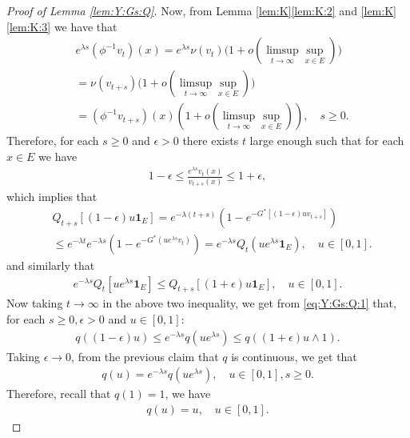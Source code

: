 \documentclass[12pt,a4paper]{amsart}
\numberwithin{equation}{section}
\theoremstyle{plain}
\theoremstyle{definition}
\begin{document}
\begin{proof}[Proof of Lemma \ref{lem:Y:Gs:Q}]
Now, from Lemma \ref{lem:K}\eqref{lem:K:2} and \ref{lem:K}\eqref{lem:K:3} we have that
\begin{align}
	& e^{\lambda s}(\phi^{-1}v_t)(x) 
  = e^{\lambda s}\nu(v_{t})\big(1+o(\limsup_{t\to \infty}\sup_{x\in E})\big) \\
  & =\nu(v_{t+s}) \big(1+o(\limsup_{t\to \infty}\sup_{x\in E})\big) \\
  & = (\phi^{-1}v_{t+s})(x) (1+o(\limsup_{t\to \infty} \sup_{x\in E}))
    , \quad s\geq 0.
\end{align}
Therefore, for each $s\geq 0$ and $\epsilon>0$ there exists $t$ large enough such that for each $x\in E$ we have
\begin{align}
	1-\epsilon\leq \frac{e^{\lambda s}v_t(x)}{v_{t+s}(x)} 
  \leq 1+\epsilon,
\end{align}
which implies that
\begin{align}
	& Q_{t+s}[ (1-\epsilon)u\mathbf 1_E ]
   = e^{-\lambda(t+s)}( 1-e^{-G^*[(1-\epsilon)uv_{t+s}]} ) \\
  & \leq e^{-\lambda t} e^{-\lambda s}( 1- e^{-G^*(ue^{\lambda s}v_t)} )
    = e^{-\lambda s}Q_t(ue^{\lambda s} \mathbf 1_E)
    , \quad u \in [0,1].
\end{align}
and similarly that
\begin{align}
	e^{-\lambda s}Q_t[ue^{\lambda s}\mathbf 1_E] 
  \leq Q_{t+s}[(1+\epsilon)u\mathbf 1_E]
  , \quad u \in [0,1].
\end{align}
Now taking $t\to \infty$ in the above two inequality, we get from \eqref{eq:Y:Gs:Q:1} that, for each $s\geq 0, \epsilon > 0$ and $u \in [0,1]$:
 \begin{align}
   q((1-\epsilon)u)\leq e^{-\lambda s}q(u e^{\lambda s}) \leq q((1+\epsilon)u \wedge 1).
 \end{align}
Taking $\epsilon \to 0$, from the previous claim that $q$ is continuous, we get that 
\begin{align}
	q(u) 
  = e^{- \lambda s} q(u e^{\lambda s}), 
  \quad u \in [0,1], s \geq 0. 
\end{align} 
Therefore, recall that $q(1) = 1$, we have
\begin{align}
	q(u) 
  = u
  , \quad u \in [0,1].
\end{align}
\end{proof}


\end{document}
